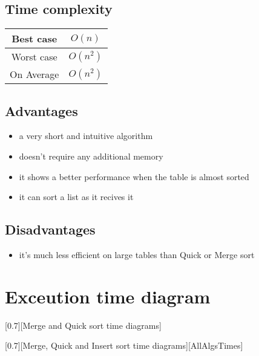 \documentclass{article}
\begin{document}
		\subsection{Time complexity}
			\begin{center}
				\begin{tabular}{c|c}
					Best case & $O(n)$\\
					\hline
					Worst case & $O(n^2)$\\
					\hline
					On Average & $O(n^2)$\\
				\end{tabular}
			\end{center}

		\begin{minipage}[t]{0.45\textwidth}
			\subsection{Advantages}
			\begin{itemize}
					\item a very short and intuitive algorithm
					\item doesn't require any additional memory
					\item it shows a better performance when the table is almost sorted
					\item it can sort a list as it recives it
			\end{itemize}
		\end{minipage}
		\begin{minipage}[t]{0.5\textwidth}
			\subsection{Disadvantages}
			\begin{itemize}
				\item it's much less efficient on large tables than Quick or Merge sort
			\end{itemize}
		\end{minipage}

	\newpage
	\section{Exceution time diagram}
		\def \QMDiagramName {Merge and Quick sort time diagrams}
		[0.7][\QMDiagramName]

		\def \MQIDiagramNm {Merge, Quick and Insert sort time diagrams}
		[0.7][\MQIDiagramNm][AllAlgsTimes]
\end{document}
